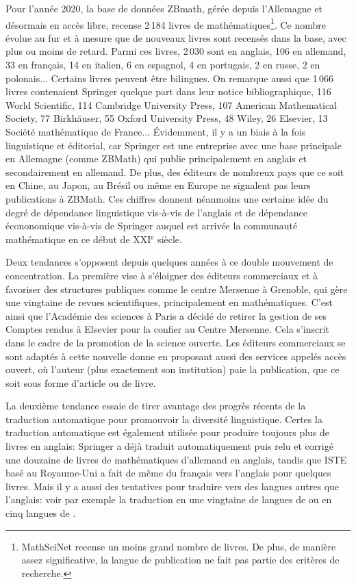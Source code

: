 Pour l'année 2020, la base de données  ZBmath, gérée depuis l'Allemagne et désormais en accès libre, recense 2\,184 livres de mathématiques\footnote{MathSciNet recense un moins grand nombre de livres. De plus, de manière assez significative, la langue de publication ne fait pas partie des critères de recherche.}. Ce nombre évolue au fur et à mesure que de nouveaux livres sont recensés dans la base, avec plus ou moins de retard. Parmi ces livres, 2\,030 sont en anglais, 106 en allemand, 33 en français, 14 en italien, 6 en espagnol, 4 en portugais, 2 en russe, 2 en polonais... Certains livres peuvent être bilingues. On remarque aussi que 1\,066 livres contenaient \og Springer \fg{} quelque part dans leur notice bibliographique, 116 \og World Scientific\fg{}, 114 \og Cambridge University Press\fg, 107 \og American Mathematical Society\fg, 77 \og Birkhäuser\fg{}, 55 \og Oxford University Press\fg, 48 \og Wiley\fg, 26 \og Elsevier\fg, 13 \og Société mathématique de France\fg{}... \'Evidemment, il y a un biais à la fois linguistique et éditorial, car Springer est une entreprise avec une base principale en Allemagne (comme ZBMath)  qui publie principalement en anglais et secondairement en allemand. De plus, des éditeurs de nombreux pays que ce soit en Chine, au Japon, au Brésil ou même en Europe ne signalent pas leurs publications à ZBMath.  Ces chiffres donnent néanmoins une certaine idée du degré de dépendance  linguistique vis-à-vis de l'anglais  et de dépendance écononomique vis-à-vis de Springer auquel est arrivée la communauté mathématique en ce début de XXI$^\text{e}$ siècle.

Deux tendances s'opposent depuis quelques années à ce double mouvement de concentration. La première vise à s'éloigner des éditeurs commerciaux  et à favoriser des structures publiques comme le centre Mersenne à Grenoble, qui gère une vingtaine de revues scientifiques, principalement en mathématiques. C'est ainsi que l'Académie des sciences à Paris a décidé de retirer la gestion de ses Comptes rendus à Elsevier pour la confier au Centre Mersenne. Cela s'inscrit dans le cadre de la promotion de la \og science ouverte\fg. Les éditeurs commerciaux se sont  adaptés à cette nouvelle donne en proposant aussi des services appelés \og accès ouvert\fg{}, où l'auteur (plus exactement son institution) paie la publication, que ce soit sous forme d'article ou  de livre. 

La deuxième tendance essaie de tirer avantage des progrès récents de la traduction automatique  pour promouvoir la diversité linguistique. Certes la traduction automatique est également utilisée pour produire toujours plus de livres en anglais: Springer a déjà traduit automatiquement puis relu et corrigé une douzaine de livres de mathématiques d'allemand en anglais, tandis que ISTE basé au Royaume-Uni a  fait de même du français vers l'anglais pour quelques livres. Mais il y a aussi des tentatives pour traduire vers des langues autres que l'anglais: voir par exemple la traduction en une vingtaine de langues de \cite{Bacaer} ou en cinq langues de \cite{Bacaer2}.

